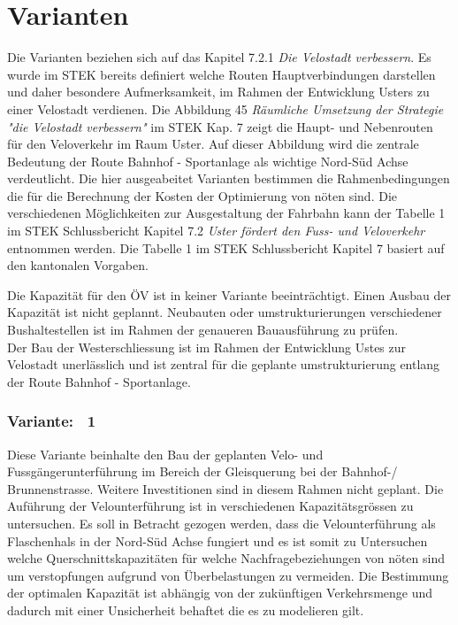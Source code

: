 %
%
%
%

\chapter{Varianten}
\label{chap:Varianten}

Die Varianten beziehen sich auf das Kapitel 7.2.1 \textit{Die Velostadt verbessern}. Es wurde im STEK bereits definiert welche Routen Hauptverbindungen darstellen und daher besondere Aufmerksamkeit, im Rahmen der Entwicklung Usters zu einer Velostadt verdienen.
Die Abbildung 45 \textit{Räumliche Umsetzung der Strategie "die Velostadt verbessern"} im STEK Kap. 7 zeigt die Haupt- und Nebenrouten für den Veloverkehr im Raum Uster.
Auf dieser Abbildung wird die zentrale Bedeutung der Route Bahnhof - Sportanlage als wichtige Nord-Süd Achse verdeutlicht.
Die hier ausgeabeitet Varianten bestimmen die Rahmenbedingungen die für die Berechnung der Kosten der Optimierung von nöten sind. 
Die verschiedenen Möglichkeiten zur Ausgestaltung der Fahrbahn kann der Tabelle 1 im STEK Schlussbericht Kapitel 7.2 \textit{Uster fördert den Fuss- und Veloverkehr} entnommen werden.  
Die Tabelle 1 im STEK Schlussbericht Kapitel 7 basiert auf den kantonalen Vorgaben. 

Die Kapazität für den ÖV ist in keiner Variante beeinträchtigt. Einen Ausbau der Kapazität ist nicht geplannt. Neubauten oder umstrukturierungen verschiedener Bushaltestellen ist im Rahmen der genaueren Bauausführung zu prüfen. \\
Der Bau der Westerschliessung ist im Rahmen der Entwicklung Ustes zur Velostadt unerlässlich und ist zentral für die geplante umstrukturierung entlang der Route Bahnhof - Sportanlage.

\subsection{Variante: \ 1}
\label{chap:V1}
	
Diese Variante beinhalte den Bau der geplanten Velo- und Fussgängerunterführung im Bereich der Gleisquerung bei der Bahnhof-/ Brunnenstrasse. Weitere Investitionen sind in diesem Rahmen nicht geplant. Die Auführung der Velounterführung ist in verschiedenen Kapazitätsgrössen zu untersuchen. Es soll in Betracht gezogen werden, dass die Velounterführung als Flaschenhals in der Nord-Süd Achse fungiert und es ist somit zu Untersuchen welche Querschnittskapazitäten für welche Nachfragebeziehungen von nöten sind um verstopfungen aufgrund von Überbelastungen zu vermeiden. Die Bestimmung der optimalen Kapazität ist abhängig von der zukünftigen Verkehrsmenge und dadurch mit einer Unsicherheit behaftet die es zu modelieren gilt. 

